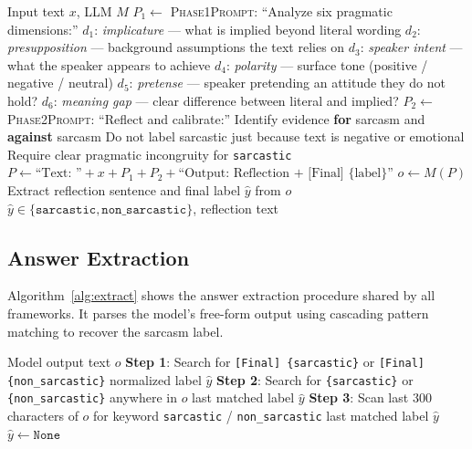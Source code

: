 \documentclass{article} %
\begin{document}
\begin{algorithm}[htbp]
\caption{PMP Two-Phase Inference (Framework~1)}
\label{alg:pmp}
\begin{algorithmic}[1]
\REQUIRE Input text $x$, LLM $M$
\STATE $P_1 \leftarrow$ \textsc{Phase1Prompt}: ``Analyze six pragmatic dimensions:''
\STATE \quad $d_1$: \textit{implicature} --- what is implied beyond literal wording
\STATE \quad $d_2$: \textit{presupposition} --- background assumptions the text relies on
\STATE \quad $d_3$: \textit{speaker intent} --- what the speaker appears to achieve
\STATE \quad $d_4$: \textit{polarity} --- surface tone (positive / negative / neutral)
\STATE \quad $d_5$: \textit{pretense} --- speaker pretending an attitude they do not hold?
\STATE \quad $d_6$: \textit{meaning gap} --- clear difference between literal and implied?
\STATE $P_2 \leftarrow$ \textsc{Phase2Prompt}: ``Reflect and calibrate:''
\STATE \quad Identify evidence \textbf{for} sarcasm and \textbf{against} sarcasm
\STATE \quad Do not label sarcastic just because text is negative or emotional
\STATE \quad Require clear pragmatic incongruity for \texttt{sarcastic}
\STATE $P \leftarrow \text{``Text: ''} + x + P_1 + P_2 + \text{``Output: Reflection + [Final] \{label\}''}$
\STATE $o \leftarrow M(P)$ 
\STATE Extract reflection sentence and final label $\hat{y}$ from $o$
\RETURN $\hat{y} \in \{\texttt{sarcastic}, \texttt{non\_sarcastic}\}$, reflection text
\end{algorithmic}
\end{algorithm}

\subsection{Answer Extraction}

Algorithm~\ref{alg:extract} shows the answer extraction procedure shared by all frameworks. It parses the model's free-form output using cascading pattern matching to recover the sarcasm label.

\begin{algorithm}[htbp]
\caption{Answer Extraction from Model Output}
\label{alg:extract}
\begin{algorithmic}[1]
\REQUIRE Model output text $o$
\STATE \textbf{Step 1}: Search for \texttt{[Final] \{sarcastic\}} or \texttt{[Final] \{non\_sarcastic\}}
    \RETURN normalized label $\hat{y}$
\ENDIF
\STATE \textbf{Step 2}: Search for \texttt{\{sarcastic\}} or \texttt{\{non\_sarcastic\}} anywhere in $o$
    \RETURN last matched label $\hat{y}$
\ENDIF
\STATE \textbf{Step 3}: Scan last 300 characters of $o$ for keyword \texttt{sarcastic} / \texttt{non\_sarcastic}
    \RETURN last matched label $\hat{y}$
\ENDIF
\RETURN $\hat{y} \leftarrow \texttt{None}$ 
\end{algorithmic}
\end{algorithm}
\end{document}
